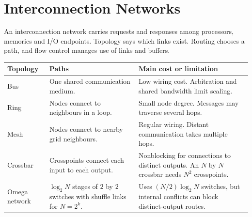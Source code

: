\documentclass[12pt,a4paper]{article}
\begin{document}
\section{Interconnection Networks}
\begin{tcolorbox}[defbox,title={Interconnect}]
An interconnection network carries requests and responses among processors, memories and I/O endpoints. Topology says which links exist. Routing chooses a path, and flow control manages use of links and buffers.
\end{tcolorbox}
\par\vspace{6pt}\noindent
\begin{tabularx}{\linewidth}{|B{2.8cm}|Y|Y|}\hline
Topology & Paths & Main cost or limitation \\ \hline
Bus & One shared communication medium. & Low wiring cost. Arbitration and shared bandwidth limit scaling. \\ \hline
Ring & Nodes connect to neighbours in a loop. & Small node degree. Messages may traverse several hops. \\ \hline
Mesh & Nodes connect to nearby grid neighbours. & Regular wiring. Distant communication takes multiple hops. \\ \hline
Crossbar & Crosspoints connect each input to each output. & Nonblocking for connections to distinct outputs. An $N$ by $N$ crossbar needs $N^2$ crosspoints. \\ \hline
Omega network & $\log_2 N$ stages of $2$ by $2$ switches with shuffle links for $N=2^k$. & Uses $(N/2)\log_2N$ switches, but internal conflicts can block distinct-output routes. \\ \hline
\end{tabularx}

\begin{tcolorbox}[tikzbox,title={Crossbar example: concurrent requests to different outputs},unbreakable]
\centering
{}
\end{tcolorbox}
\end{document}
